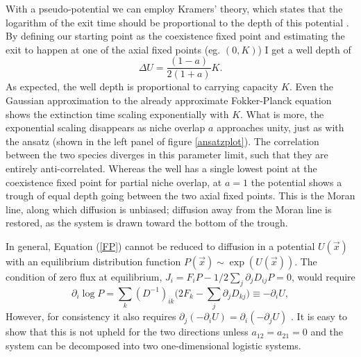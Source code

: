 With a pseudo-potential we can employ Kramers' theory, which states that the logarithm of the exit time should be proportional to the depth of this potential \cite{Hanggi1990}. 
By defining our starting point as the coexistence fixed point and estimating the exit to happen at one of the axial fixed points (eg. $(0,K)$) I get a well depth of
\begin{equation}
\Delta U = \frac{(1-a)}{2(1+a)}K. 
\end{equation}
As expected, the well depth is proportional to carrying capacity $K$. 
Even the Gaussian approximation to the already approximate Fokker-Planck equation shows the extinction time scaling exponentially with $K$. 
What is more, the exponential scaling disappears as niche overlap $a$ approaches unity, just as with the ansatz (shown in the left panel of figure \ref{ansatzplot}). 
The correlation between the two species diverges in this parameter limit, such that they are entirely anti-correlated. 
Whereas the well has a single lowest point at the coexistence fixed point for partial niche overlap, at $a=1$ the potential shows a trough of equal depth going between the two axial fixed points. 
This is the Moran line, along which diffusion is unbiased; diffusion away from the Moran line is restored, as the system is drawn toward the bottom of the trough. 

\fi%

In general, Equation (\ref{FP}) cannot be reduced to diffusion in a potential $U(\vec{x})$ with an equilibrium distribution function $P(\vec{x})\sim \exp(U(\vec{x}))$. The condition of zero flux at equilibrium, $J_i=F_iP - 1/2 \sum_{j}\partial_j D_{ij}P=0$, would require \cite{Gardiner2004}
\begin{equation*}
\partial_i \log P = \sum_k (D^{-1})_{ik} \big( 2 F_k - \sum_j \partial_j D_{kj} \big) \equiv - \partial_i U,
\end{equation*}
However, for consistency it also requires $\partial_j \left( - \partial_i U \right) = \partial_i \left( - \partial_j U \right)$ \cite{Gardiner2004}. 
It is easy to show that this is not upheld for the two directions unless $a_{12}=a_{21}=0$ and the system can be decomposed into two one-dimensional logistic systems.

